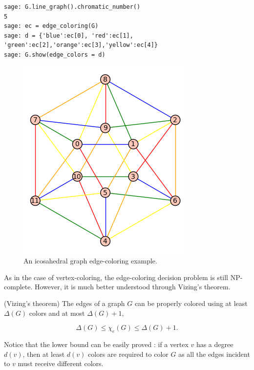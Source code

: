 \begin{example}
\begin{lstlisting}
sage: G.line_graph().chromatic_number()
5
sage: ec = edge_coloring(G)
sage: d = {'blue':ec[0], 'red':ec[1], 'green':ec[2],'orange':ec[3],'yellow':ec[4]}
sage: G.show(edge_colors = d)
\end{lstlisting}


\begin{figure}[!htbp]
\centering
{}
\includegraphics[scale=0.7]{image/graph-coloring/icosahedral-graph-edge-coloring-example}
\caption{An icosahedral graph edge-coloring example.}
\label{fig:graph-coloring:icosahedral-graph-edge-coloring-example}
\end{figure}

\end{example}


As in the case of vertex-coloring, the edge-coloring decision problem is
still NP-complete. However, it is much better understood through
Vizing's theorem.

\begin{theorem}
(Vizing's theorem)
The edges of a graph $G$ can be properly colored using at least
$\Delta(G)$ colors and at most $\Delta(G)+1$,

\[
\Delta(G)\leq \chi_e(G)\leq \Delta(G)+1.
\]
\end{theorem}

Notice that the lower bound can be easily proved : if a vertex
$v$ has a degree $d(v)$, then at least $d(v)$ colors are required
to color $G$ as all the edges incident to $v$ must receive
different colors.


